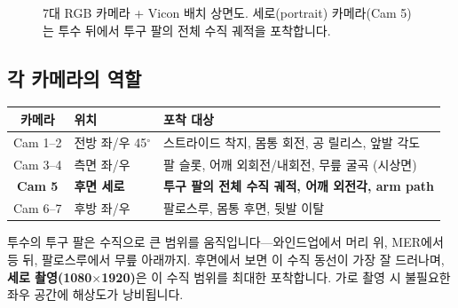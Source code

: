 \documentclass[11pt, a4paper]{report}
\begin{document}
\begin{figure}[H]
\caption{7대 RGB 카메라 + Vicon 배치 상면도. 세로(portrait) 카메라(Cam 5)는 투수 뒤에서 투구 팔의 전체 수직 궤적을 포착합니다.}
\label{fig:camera_layout}
\end{figure}

\subsection{각 카메라의 역할}

\begin{center}
\renewcommand{\arraystretch}{1.3}
\small
\begin{tabular}{clp{7cm}}
\toprule
\textbf{카메라} & \textbf{위치} & \textbf{포착 대상} \\
\midrule
Cam 1--2 & 전방 좌/우 45$^\circ$ & 스트라이드 착지, 몸통 회전, 공 릴리스, 앞발 각도 \\
Cam 3--4 & 측면 좌/우 & 팔 슬롯, 어깨 외회전/내회전, 무릎 굴곡 (시상면) \\
\textbf{Cam 5} & \textbf{후면 세로} & \textbf{투구 팔의 전체 수직 궤적, 어깨 외전각, arm path} \\
Cam 6--7 & 후방 좌/우 & 팔로스루, 몸통 후면, 뒷발 이탈 \\
\bottomrule
\end{tabular}
\end{center}

\begin{importantnote}[title={왜 후면 카메라가 세로(portrait)인가?}]
투수의 투구 팔은 수직으로 큰 범위를 움직입니다---와인드업에서 머리 위, MER에서 등 뒤, 팔로스루에서 무릎 아래까지. 후면에서 보면 이 수직 동선이 가장 잘 드러나며, \textbf{세로 촬영(1080$\times$1920)}은 이 수직 범위를 최대한 포착합니다. 가로 촬영 시 불필요한 좌우 공간에 해상도가 낭비됩니다.
\end{importantnote}
\end{document}
